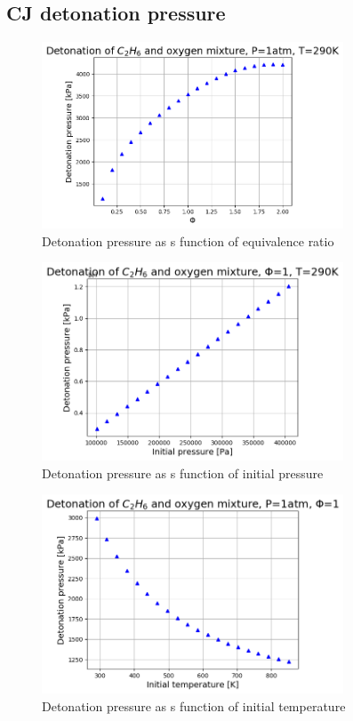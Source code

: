 \documentclass[a4paper]{article}
\begin{document}
\subsection{CJ detonation pressure}
\begin{figure}[H]
\centering
\includegraphics[width=0.8\textwidth]{pressure_Fi.png}
\caption{Detonation pressure as s function of equivalence ratio}
\end{figure}

\begin{figure}[H]
\centering
\includegraphics[width=0.8\textwidth]{pressure_Pi.png}
\caption{Detonation pressure as s function of initial pressure}
\end{figure}

\begin{figure}[H]
\centering
\includegraphics[width=0.8\textwidth]{pressure_Ti.png}
\caption{Detonation pressure as s function of initial temperature}
\end{figure}
\end{document}
